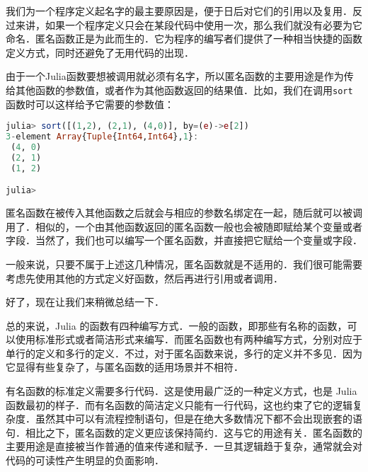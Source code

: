 我们为一个程序定义起名字的最主要原因是，便于日后对它们的引用以及复用．反过来讲，如果一个程序定义只会在某段代码中使用一次，那么我们就没有必要为它命名．匿名函数正是为此而生的．它为程序的编写者们提供了一种相当快捷的函数定义方式，同时还避免了无用代码的出现．

由于一个Julia函数要想被调用就必须有名字，所以匿名函数的主要用途是作为传给其他函数的参数值，或者作为其他函数返回的结果值．比如，我们在调用\verb|sort|函数时可以这样给予它需要的参数值：

\begin{lstlisting}[language=julia]
julia> sort([(1,2), (2,1), (4,0)], by=(e)->e[2])
3-element Array{Tuple{Int64,Int64},1}:
 (4, 0)
 (2, 1)
 (1, 2)

julia> 
\end{lstlisting}

匿名函数在被传入其他函数之后就会与相应的参数名绑定在一起，随后就可以被调用了．相似的，一个由其他函数返回的匿名函数一般也会被随即赋给某个变量或者字段．当然了，我们也可以编写一个匿名函数，并直接把它赋给一个变量或字段．

一般来说，只要不属于上述这几种情况，匿名函数就是不适用的．我们很可能需要考虑先使用其他的方式定义好函数，然后再进行引用或者调用．

好了，现在让我们来稍微总结一下．

总的来说，Julia 的函数有四种编写方式．一般的函数，即那些有名称的函数，可以使用标准形式或者简洁形式来编写．而匿名函数也有两种编写方式，分别对应于单行的定义和多行的定义．不过，对于匿名函数来说，多行的定义并不多见．因为它显得有些复杂了，与匿名函数的适用场景并不相符．

有名函数的标准定义需要多行代码．这是使用最广泛的一种定义方式，也是 Julia 函数最初的样子．而有名函数的简洁定义只能有一行代码，这也约束了它的逻辑复杂度．虽然其中可以有流程控制语句，但是在绝大多数情况下都不会出现嵌套的语句．相比之下，匿名函数的定义更应该保持简约．这与它的用途有关．匿名函数的主要用途是直接被当作普通的值来传递和赋予．一旦其逻辑趋于复杂，通常就会对代码的可读性产生明显的负面影响．